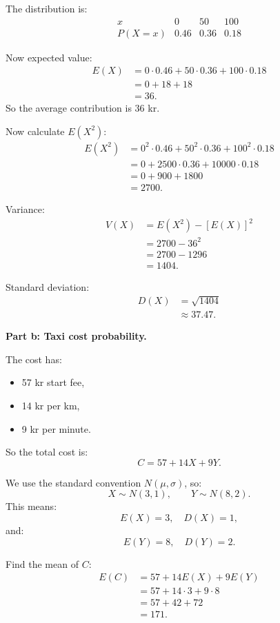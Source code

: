 \documentclass[11pt,a4paper]{article}
\begin{document}
The distribution is:
\[
\begin{array}{c|ccc}
x & 0 & 50 & 100\\ \hline
P(X=x) & 0.46 & 0.36 & 0.18
\end{array}
\]

Now expected value:
\begin{align*}
E(X)
&=0\cdot 0.46+50\cdot 0.36+100\cdot 0.18\\
&=0+18+18\\
&=36.
\end{align*}
So the average contribution is 36 kr.

Now calculate \(E(X^2)\):
\begin{align*}
E(X^2)
&=0^2\cdot 0.46+50^2\cdot 0.36+100^2\cdot 0.18\\
&=0+2500\cdot 0.36+10000\cdot 0.18\\
&=0+900+1800\\
&=2700.
\end{align*}

Variance:
\begin{align*}
V(X)
&=E(X^2)-[E(X)]^2\\
&=2700-36^2\\
&=2700-1296\\
&=1404.
\end{align*}

Standard deviation:
\begin{align*}
D(X)
&=\sqrt{1404}\\
&\approx 37.47.
\end{align*}

\textbf{Part b: Taxi cost probability.}

The cost has:
\begin{itemize}[leftmargin=*]
    \item 57 kr start fee,
    \item 14 kr per km,
    \item 9 kr per minute.
\end{itemize}

So the total cost is:
\[
C=57+14X+9Y.
\]

We use the standard convention \(N(\mu,\sigma)\), so:
\[
X\sim N(3,1),\qquad Y\sim N(8,2).
\]
This means:
\[
E(X)=3,\quad D(X)=1,
\]
and:
\[
E(Y)=8,\quad D(Y)=2.
\]

Find the mean of \(C\):
\begin{align*}
E(C)
&=57+14E(X)+9E(Y)\\
&=57+14\cdot 3+9\cdot 8\\
&=57+42+72\\
&=171.
\end{align*}
\end{document}
